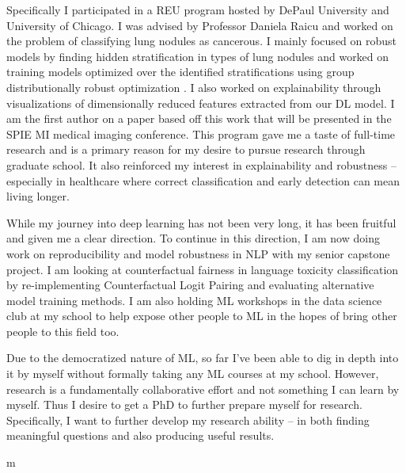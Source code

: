 \documentclass[12pt]{article}
\begin{document}
 Specifically I participated in a REU program hosted by DePaul University and University of Chicago. I was advised by Professor Daniela Raicu and worked on the problem of classifying lung nodules as cancerous. I mainly focused on robust models by finding hidden stratification in types of lung nodules and worked on training models optimized over the identified stratifications using group distributionally robust optimization \cite{Sagawa*2020Distributionally}. I also worked on explainability through visualizations of dimensionally reduced features extracted from our DL model. I am the first author on a paper based off this work that will be presented in the SPIE MI medical imaging conference. This program gave me a taste of full-time research and is a primary reason for my desire to pursue research through graduate school.
It also reinforced my interest in explainability and robustness -- especially in healthcare where correct classification and early detection can mean living longer. 
 
While my journey into deep learning has not been very long, it has been fruitful and given me a clear direction.
To continue in this direction, I am now doing work on reproducibility and model robustness in NLP with my senior capstone project. I am looking at counterfactual fairness in language toxicity classification by re-implementing Counterfactual Logit Pairing \cite{garg2019counterfactual} and evaluating alternative model training methods. I am also holding ML workshops in the data science club at my school to help expose other people to ML in the hopes of bring other people to this field too.

Due to the democratized nature of ML, so far I've been able to dig in depth into it by myself without formally taking any ML courses at my school.
However, research is a fundamentally collaborative effort and not something I can learn by myself. Thus I desire to get a PhD to further prepare myself for research. Specifically, I want to further develop my research ability -- in both finding meaningful questions and also producing useful results.



m




\end{document}
